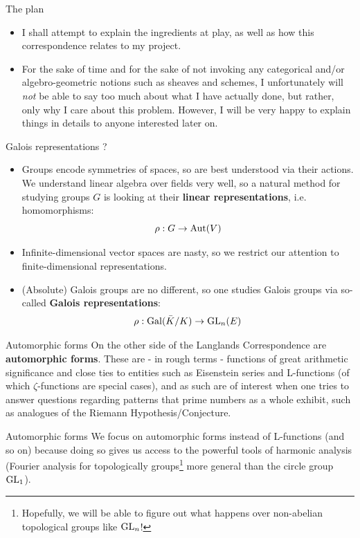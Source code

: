 \documentclass[professionalfonts]{beamer}
\begin{document}
    \begin{frame}{The plan}
        \begin{itemize}
            \item I shall attempt to explain the ingredients at play, as well as how this correspondence relates to my project.
            \item For the sake of time and for the sake of not invoking any categorical and/or algebro-geometric notions such as sheaves and schemes, I unfortunately will \textit{not} be able to say too much about what I have actually done, but rather, only why I care about this problem. However, I will be very happy to explain things in details to anyone interested later on.
        \end{itemize}
    \end{frame}
    
    \begin{frame}{Galois representations ?}
        \begin{itemize}
            \item Groups encode symmetries of spaces, so are best understood via their actions. We understand linear algebra over fields very well, so a natural method for studying groups $G$ is looking at their \textbf{linear representations}, i.e. homomorphisms:
                $$\rho: G \to \mathrm{Aut}(V)$$
            \item Infinite-dimensional vector spaces are nasty, so we restrict our attention to finite-dimensional representations.
            \item (Absolute) Galois groups are no different, so one studies Galois groups via so-called \textbf{Galois representations}:
                $$\rho: \mathrm{Gal}(\bar{K}/K) \to \operatorname{GL}_n(E)$$
        \end{itemize}
    \end{frame}
    
    \begin{frame}{Automorphic forms}
        On the other side of the Langlands Correspondence are \textbf{automorphic forms}. These are - in rough terms - functions of great arithmetic significance and close ties to entities such as Eisenstein series and L-functions (of which $\zeta$-functions are special cases), and as such are of interest when one tries to answer questions regarding patterns that prime numbers as a whole exhibit, such as analogues of the Riemann Hypothesis/Conjecture.
    \end{frame}
    
    \begin{frame}{Automorphic forms}
         We focus on automorphic forms instead of L-functions (and so on) because doing so gives us access to the powerful tools of harmonic analysis (Fourier analysis for topologically groups\footnote{Hopefully, we will be able to figure out what happens over non-abelian topological groups like $\operatorname{GL}_n$!} more general than the circle group $\operatorname{GL}_1$). 
    \end{frame}
    
\end{document}
